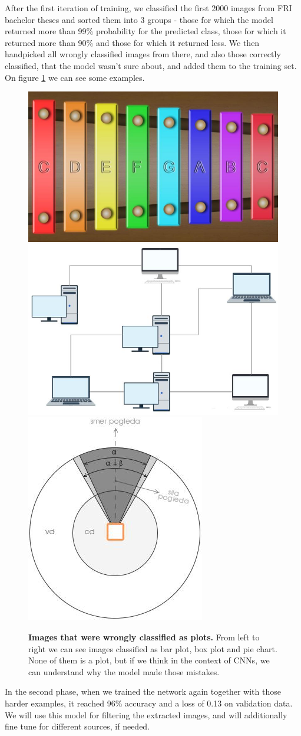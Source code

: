\documentclass[fleqn,moreauthors,10pt]{ds_report}
\begin{document}
	After the first iteration of training, we classified the first 2000 images from FRI bachelor theses and sorted them into 3 groups - those for which the model returned more than 99\% probability for the predicted class, those for which it returned more than 90\% and those for which it returned less. We then handpicked all wrongly classified images from there, and also those correctly classified, that the model wasn't sure about, and added them to the training set. On figure \ref{wrong phase1} we can see some examples.
	
	\begin{figure}[h]
		\includegraphics[width=0.36\linewidth]{bar_wrong_ph1.jpeg}
		\includegraphics[width=0.36\linewidth]{box_wrong_ph1.jpeg}
		\includegraphics[width=0.24\linewidth]{pie_wrong_ph1.jpeg}
		\caption{\textbf{Images that were wrongly classified as plots.} From left to right we can see images classified as bar plot, box plot and pie chart. None of them is a plot, but if we think in the context of CNNs, we can understand why the model made those mistakes.}
		\label{wrong phase1}
	\end{figure}
	
	In the second phase, when we trained the network again together with those harder examples, it reached 96\% accuracy and a loss of 0.13 on validation data. We will use this model for filtering the extracted images, and will additionally fine tune for different sources, if needed.
	
\end{document}
